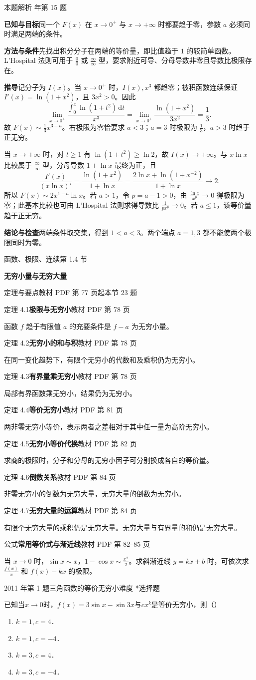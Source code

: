 \documentclass[UTF8,zihao=-4,fontset=fandol]{ctexart}
\renewcommand{\lim}{\operatorname*{lim}\limits}
\newcommand{\SectionHeading}[4]{%
  \clearpage\hypertarget{sec-#1}{}%
  {\small\textcolor{accent}{#2\hfill 第 #1 节}}\par\medskip
  {\LARGE\bfseries #3}\par\smallskip
  {\small\textcolor{muted}{#4}}\par\bigskip}
\newcommand{\Theory}[4]{%
  {\small\textcolor{accent}{#1}\quad\textbf{#3}\hfill\textcolor{muted}{教材 PDF 第 #2 页}}\par
  {\small #4}\par\smallskip}
\newcommand{\pickout}{\hfill（\hspace{1.4em}）}
\newenvironment{abcd}{\begin{enumerate}[label=\textup{(\Alph*)},leftmargin=2.3em,itemsep=1pt,topsep=4pt,parsep=1pt]}{\end{enumerate}}
\newcounter{BankQuestion}
\newcommand{\QuestionPage}[7]{%
  \stepcounter{BankQuestion}%
  \par\noindent\begin{minipage}{\linewidth}
  \raggedright
  {\small\textcolor{black!60}{#3\quad #5\quad 难度 #7}\hfill\textcolor{accent}{#2}}\par\smallskip}
\newcommand{\QuestionEnd}{\end{minipage}\par\medskip}
\newcommand{\QuestionPage}[7]{%
  \clearpage
  \stepcounter{BankQuestion}%
  {\small\textcolor{accent}{#1\hfill #2}}\par\medskip
  {\small\textcolor{black!60}{#3\quad #5\quad 难度 #7\hfill \arabic{BankQuestion} / 234}}\par\vspace{9bp}}
\newcommand{\QuestionEnd}{}
\newenvironment{QuestionSolution}[1]{%
  \clearpage
  {\small\textcolor{black!60}{本题解析\quad #1}}\par\medskip
}{\par\clearpage}
\begin{document}
\begin{QuestionSolution}{2011 年第 15 题}
\textbf{已知与目标}\quad 同一个 \(F(x)\) 在 \(x\to0^+\) 与 \(x\to+\infty\) 时都要趋于零，参数 \(a\) 必须同时满足两端的条件。

\textbf{方法与条件}\quad 先找出积分分子在两端的等价量，即比值趋于 \(1\) 的较简单函数。L'Hospital 法则可用于 \(\frac{0}{0}\) 或 \(\frac{\infty}{\infty}\) 型，要求附近可导、分母导数非零且导数比极限存在。

\textbf{推导}\quad 记分子为 \(I(x)\)。当 \(x\to0^+\) 时，\(I(x),x^3\) 都趋零；被积函数连续保证 \(I'(x)=\ln(1+x^2)\)，且 \(3x^2>0\)。因此
\[
\lim_{x\to0^+}\frac{\int_0^x\ln(1+t^2)\,\mathrm{d}t}{x^3}
=\lim_{x\to0^+}\frac{\ln(1+x^2)}{3x^2}=\frac{1}{3}.
\]
故 \(F(x)\sim\frac{1}{3}x^{3-a}\)。右极限为零恰要求 \(a<3\)；\(a=3\) 时极限为 \(\frac{1}{3}\)，\(a>3\) 时趋于正无穷。

当 \(x\to+\infty\) 时，对 \(t\ge1\) 有 \(\ln(1+t^2)\ge\ln2\)，故 \(I(x)\to+\infty\)。与 \(x\ln x\) 比较属于 \(\frac{\infty}{\infty}\) 型，分母导数 \(1+\ln x\) 最终为正，且
\[
\frac{I'(x)}{(x\ln x)'}=\frac{\ln(1+x^2)}{1+\ln x}
=\frac{2\ln x+\ln(1+x^{-2})}{1+\ln x}\longrightarrow2.
\]
所以 \(F(x)\sim2x^{1-a}\ln x\)。若 \(a>1\)，令 \(p=a-1>0\)，由 \(\frac{\ln x}{x^p}\to0\) 得极限为零；此基本比较也可由 L'Hospital 法则求得导数比 \(\frac{1}{p x^p}\to0\)。若 \(a\le1\)，该等价量趋于正无穷。

\textbf{结论与检查}\quad 两端条件取交集，得到 \(\boxed{1<a<3}\)。两个端点 \(a=1,3\) 都不能使两个极限同时为零。
\end{QuestionSolution}

\SectionHeading{1.4}{函数、极限、连续}{无穷小量与无穷大量}{定理与要点\quad 教材 PDF 第 77 页起\hfill 本节 23 题}
\Theory{定理 4.1}{78}{极限与无穷小}{函数 \(f\) 趋于有限值 \(a\) 的充要条件是 \(f-a\) 为无穷小量。}
\Theory{定理 4.2}{78}{无穷小的和与积}{在同一变化趋势下，有限个无穷小的代数和及乘积仍为无穷小。}
\Theory{定理 4.3}{78}{有界量乘无穷小}{局部有界函数乘无穷小，结果仍为无穷小。}
\Theory{定理 4.4}{81}{等价无穷小}{两非零无穷小等价，表示两者之差相对于其中任一量为高阶无穷小。}
\Theory{定理 4.5}{82}{无穷小等价代换}{求商的极限时，分子和分母的无穷小因子可分别换成各自的等价量。}
\Theory{定理 4.6}{84}{倒数关系}{非零无穷小的倒数为无穷大量，无穷大量的倒数为无穷小。}
\Theory{定理 4.7}{84}{无穷大量的运算}{有限个无穷大量的乘积仍是无穷大量。无穷大量与有界量的和仍是无穷大量。}
\Theory{公式}{82--85}{常用等价式与渐近线}{当 \(x\to0\) 时，\(\sin x\sim x\)，\(1-\cos x\sim\frac{x^2}{2}\)。求斜渐近线 \(y=kx+b\) 时，可依次求 \(\frac{f(x)}{x}\) 和 \(f(x)-kx\) 的极限。}
\QuestionPage{1.4 无穷小量与无穷大量}{选择题}{2011 年第 1 题}{1}{三角函数的等价无穷小}{018 / 234}{*}
已知当$x \to 0$时，$f(x) = 3\sin x - \sin 3x$与$cx^k$是等价无穷小，则\pickout{}
\begin{abcd}
\item $k = 1,c = 4$．
\item $k = 1,c = - 4$．
\item $k = 3,c = 4$．
\item $k = 3,c = - 4$．
\end{abcd}
\QuestionEnd
\end{document}
